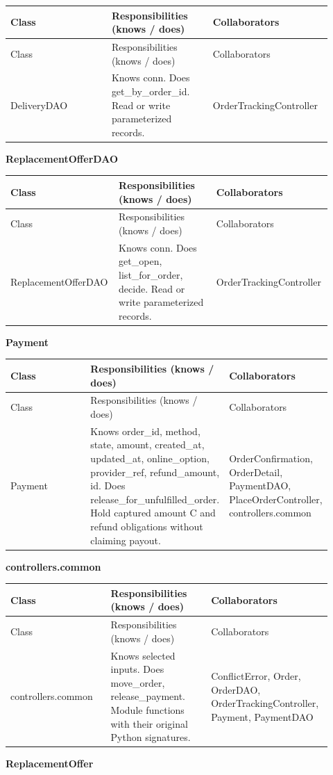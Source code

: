 \begin{longtable}{>{\raggedright\arraybackslash}p{0.3067\linewidth}>{\raggedright\arraybackslash}p{0.3067\linewidth}>{\raggedright\arraybackslash}p{0.3067\linewidth}}
Class & Responsibilities (knows / does) & Collaborators \\
\hline\endfirsthead
Class & Responsibilities (knows / does) & Collaborators \\
\hline\endhead
DeliveryDAO & Knows conn. Does get\_by\_order\_id. Read or write parameterized records. & OrderTrackingController \\
\end{longtable}
\textbf{ReplacementOfferDAO}

\begin{longtable}{>{\raggedright\arraybackslash}p{0.3067\linewidth}>{\raggedright\arraybackslash}p{0.3067\linewidth}>{\raggedright\arraybackslash}p{0.3067\linewidth}}
Class & Responsibilities (knows / does) & Collaborators \\
\hline\endfirsthead
Class & Responsibilities (knows / does) & Collaborators \\
\hline\endhead
ReplacementOfferDAO & Knows conn. Does get\_open, list\_for\_order, decide. Read or write parameterized records. & OrderTrackingController \\
\end{longtable}
\textbf{Payment}

\begin{longtable}{>{\raggedright\arraybackslash}p{0.3067\linewidth}>{\raggedright\arraybackslash}p{0.3067\linewidth}>{\raggedright\arraybackslash}p{0.3067\linewidth}}
Class & Responsibilities (knows / does) & Collaborators \\
\hline\endfirsthead
Class & Responsibilities (knows / does) & Collaborators \\
\hline\endhead
Payment & Knows order\_id, method, state, amount, created\_at, updated\_at, online\_option, provider\_ref, refund\_amount, id. Does release\_for\_unfulfilled\_order. Hold captured amount C and refund obligations without claiming payout. & OrderConfirmation, OrderDetail, PaymentDAO, PlaceOrderController, controllers.common \\
\end{longtable}
\textbf{controllers.common}

\begin{longtable}{>{\raggedright\arraybackslash}p{0.3067\linewidth}>{\raggedright\arraybackslash}p{0.3067\linewidth}>{\raggedright\arraybackslash}p{0.3067\linewidth}}
Class & Responsibilities (knows / does) & Collaborators \\
\hline\endfirsthead
Class & Responsibilities (knows / does) & Collaborators \\
\hline\endhead
controllers.common & Knows selected inputs. Does move\_order, release\_payment. Module functions with their original Python signatures. & ConflictError, Order, OrderDAO, OrderTrackingController, Payment, PaymentDAO \\
\end{longtable}
\textbf{ReplacementOffer}

